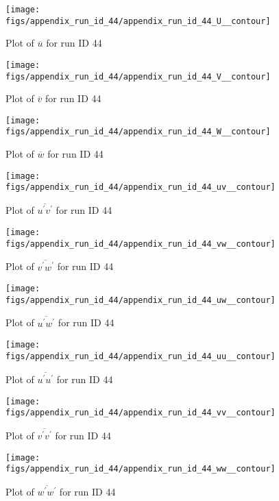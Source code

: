 \begin{figure}[H]
\centering
\texttt{[image: figs/appendix\_run\_id\_44/appendix\_run\_id\_44\_U\_\_contour]}
\caption{Plot of $\overline{u}$ for run ID 44}
\label{fig:appendix_run_id_44_U__contour}
\end{figure}


\begin{figure}[H]
\centering
\texttt{[image: figs/appendix\_run\_id\_44/appendix\_run\_id\_44\_V\_\_contour]}
\caption{Plot of $\overline{v}$ for run ID 44}
\label{fig:appendix_run_id_44_V__contour}
\end{figure}


\begin{figure}[H]
\centering
\texttt{[image: figs/appendix\_run\_id\_44/appendix\_run\_id\_44\_W\_\_contour]}
\caption{Plot of $\overline{w}$ for run ID 44}
\label{fig:appendix_run_id_44_W__contour}
\end{figure}


\begin{figure}[H]
\centering
\texttt{[image: figs/appendix\_run\_id\_44/appendix\_run\_id\_44\_uv\_\_contour]}
\caption{Plot of $\overline{u^\prime v^\prime}$ for run ID 44}
\label{fig:appendix_run_id_44_uv__contour}
\end{figure}


\begin{figure}[H]
\centering
\texttt{[image: figs/appendix\_run\_id\_44/appendix\_run\_id\_44\_vw\_\_contour]}
\caption{Plot of $\overline{v^\prime w^\prime}$ for run ID 44}
\label{fig:appendix_run_id_44_vw__contour}
\end{figure}


\begin{figure}[H]
\centering
\texttt{[image: figs/appendix\_run\_id\_44/appendix\_run\_id\_44\_uw\_\_contour]}
\caption{Plot of $\overline{u^\prime w^\prime}$ for run ID 44}
\label{fig:appendix_run_id_44_uw__contour}
\end{figure}


\begin{figure}[H]
\centering
\texttt{[image: figs/appendix\_run\_id\_44/appendix\_run\_id\_44\_uu\_\_contour]}
\caption{Plot of $\overline{u^\prime u^\prime}$ for run ID 44}
\label{fig:appendix_run_id_44_uu__contour}
\end{figure}


\begin{figure}[H]
\centering
\texttt{[image: figs/appendix\_run\_id\_44/appendix\_run\_id\_44\_vv\_\_contour]}
\caption{Plot of $\overline{v^\prime v^\prime}$ for run ID 44}
\label{fig:appendix_run_id_44_vv__contour}
\end{figure}


\begin{figure}[H]
\centering
\texttt{[image: figs/appendix\_run\_id\_44/appendix\_run\_id\_44\_ww\_\_contour]}
\caption{Plot of $\overline{w^\prime w^\prime}$ for run ID 44}
\label{fig:appendix_run_id_44_ww__contour}
\end{figure}



